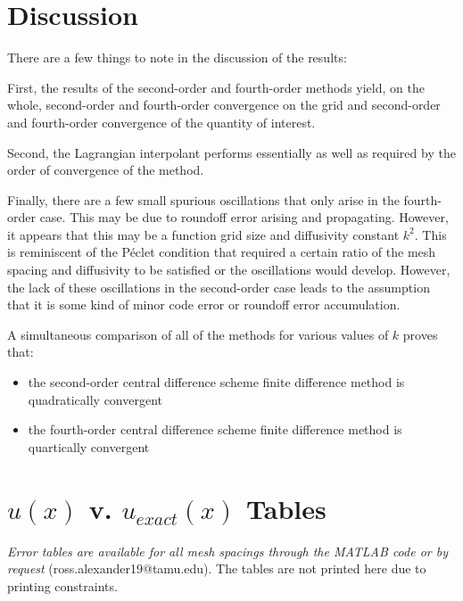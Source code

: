 \documentclass[10pt]{article}		%
\numberwithin{equation}{section}
\begin{document}
\begin{table}[H]
	
\end{table}

\newpage

\section{Discussion}

There are a few things to note in the discussion of the results:

First, the results of the second-order and fourth-order methods yield, on the whole, second-order and fourth-order convergence on the grid and second-order and fourth-order convergence of the quantity of interest.

Second, the Lagrangian interpolant performs essentially as well as required by the order of convergence of the method.

Finally, there are a few small spurious oscillations that only arise in the fourth-order case. This may be due to roundoff error arising and propagating. However, it appears that this may be a function grid size and diffusivity constant $k^2$. This is reminiscent of the P\'eclet condition that required a certain ratio of the mesh spacing and diffusivity to be satisfied or the oscillations would develop. However, the lack of these oscillations in the second-order case leads to the assumption that it is some kind of minor code error or roundoff error accumulation.

A simultaneous comparison of all of the methods for various values of $k$ proves that:

\begin{itemize}
	\item the second-order central difference scheme finite difference method is quadratically convergent
	\item the fourth-order central difference scheme finite difference method is quartically convergent
\end{itemize}

\newpage

\appendix

\section{$u(x)$ v. $u_{exact}(x)$ Tables}

\textit{Error tables are available for all mesh spacings through the MATLAB code or by request} (ross.alexander19@tamu.edu). The tables are not printed here due to printing constraints.
\end{document}

